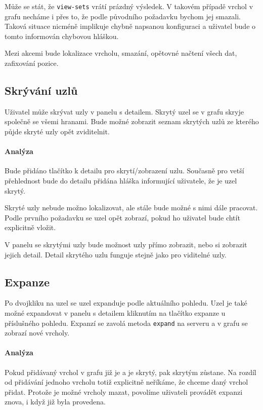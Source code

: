Může se stát, že \texttt{view-sets} vrátí prázdný výsledek. V takovém případě vrchol v grafu necháme i přes to, že podle původního požadavku bychom jej smazali. Taková situace nicméně implikuje chybně napsanou konfiguraci a uživatel bude o tomto informován chybovou hláškou.

Mezi akcemi bude lokalizace vrcholu, smazání, opětovné načtení všech dat, zafixování pozice.

\subsection*{Skrývání uzlů}
Uživatel může skrývat uzly v panelu s detailem. Skrytý uzel se v grafu skryje společně se všemi hranami. Bude možné zobrazit seznam skrytých uzlů ze kterého půjde skryté uzly opět zviditelnit.

\paragraph{Analýza} Bude přidáno tlačítko k detailu pro skrytí/zobrazení uzlu. Současně pro vetší přehlednost bude do detailu přidána hláška informující uživatele, že je uzel skrytý.

Skryté uzly nebude možno lokalizovat, ale stále bude možné s nimi dále pracovat. Podle prvního požadavku se uzel opět zobrazí, pokud ho uživatel bude chtít explicitně vložit.

V panelu se skrytými uzly bude možnost uzly přímo zobrazit, nebo si zobrazit jejich detail. Detail skrytého uzlu funguje stejně jako pro viditelné uzly.

\subsection*{Expanze}
Po dvojkliku na uzel se uzel expanduje podle aktuálního pohledu. Uzel je také možné expandovat v panelu s detailem kliknutím na tlačítko expanze u příslušného pohledu. Expanzí se zavolá metoda \texttt{expand} na serveru a v grafu se zobrazí nové vrcholy.

\paragraph{Analýza} Pokud přidávaný vrchol v grafu již je a je skrytý, pak skrytým zůstane. Na rozdíl od přidávání jednoho vrcholu totiž explicitně neříkáme, že chceme daný vrchol přidat. Protože je možné vrcholy mazat, povolíme uživateli provádět expanzi znova, i když již byla provedena.

